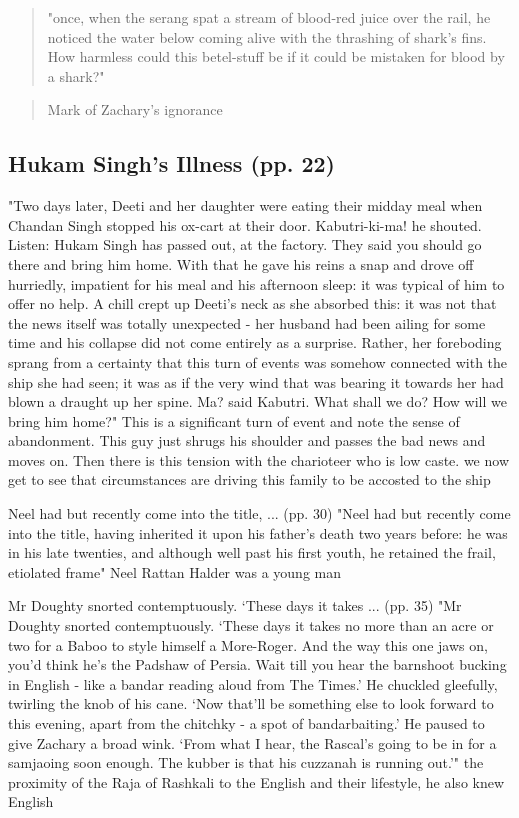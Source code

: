 \begin{quote}
"once, when the serang spat a stream of blood-red juice over the rail, he noticed the water below coming alive with the thrashing of shark’s fins. How harmless could this betel-stuff be if it could be mistaken for blood by a shark?"
\end{quote}
\begin{quote}
Mark of Zachary's ignorance
\end{quote}

\subsection{Hukam Singh's Illness (pp. 22)}


"Two days later, Deeti and her daughter were eating their midday meal when Chandan Singh stopped his ox-cart at their door. Kabutri-ki-ma! he shouted. Listen: Hukam Singh has passed out, at the factory. They said you should go there and bring him home. With that he gave his reins a snap and drove off hurriedly, impatient for his meal and his afternoon sleep: it was typical of him to offer no help. A chill crept up Deeti’s neck as she absorbed this: it was not that the news itself was totally unexpected - her husband had been ailing for some time and his collapse did not come entirely as a surprise. Rather, her foreboding sprang from a certainty that this turn of events was somehow connected with the ship she had seen; it was as if the very wind that was bearing it towards her had blown a draught up her spine. Ma? said Kabutri. What shall we do? How will we bring him home?"
This is a significant turn of event and note the sense of abandonment. This guy just shrugs his shoulder and passes the bad news and moves on. Then there is this tension with the charioteer who is low caste. we now get to see that circumstances are driving this family to be accosted to the ship

Neel had but recently come into the title, ... (pp. 30)
"Neel had but recently come into the title, having inherited it upon his father’s death two years before: he was in his late twenties, and although well past his first youth, he retained the frail, etiolated frame"
Neel Rattan Halder was a young man

Mr Doughty snorted contemptuously. ‘These days it takes ... (pp. 35)
"Mr Doughty snorted contemptuously. ‘These days it takes no more than an acre or two for a Baboo to style himself a More-Roger. And the way this one jaws on, you’d think he’s the Padshaw of Persia. Wait till you hear the barnshoot bucking in English - like a bandar reading aloud from The Times.’ He chuckled gleefully, twirling the knob of his cane. ‘Now that’ll be something else to look forward to this evening, apart from the chitchky - a spot of bandarbaiting.’ He paused to give Zachary a broad wink. ‘From what I hear, the Rascal’s going to be in for a samjaoing soon enough. The kubber is that his cuzzanah is running out.’"
the proximity of the Raja of Rashkali to the English and their lifestyle, he also knew English

